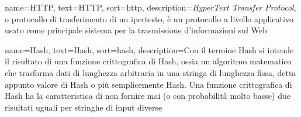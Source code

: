 {
	name={HTTP},
	text={HTTP},
	sort={http},
	description={\textit{HyperText Transfer Protocol}, o protocollo di trasferimento di un ipertesto, è un protocollo a livello applicativo usato come principale sistema per la trasmissione d'informazioni sul Web}
}

{
	name={Hash},
	text={Hash},
	sort={hash},
	description={Con il termine Hash si intende il risultato di una funzione crittografica di Hash, ossia un algoritmo matematico che trasforma dati di lunghezza arbitraria in una stringa di lunghezza fissa, detta appunto valore di Hash o più semplicemente Hash. Una funzione crittografica di Hash ha la caratteristica di non fornire mai (o con probabilità molto basse) due risultati uguali per stringhe di input diverse}
}